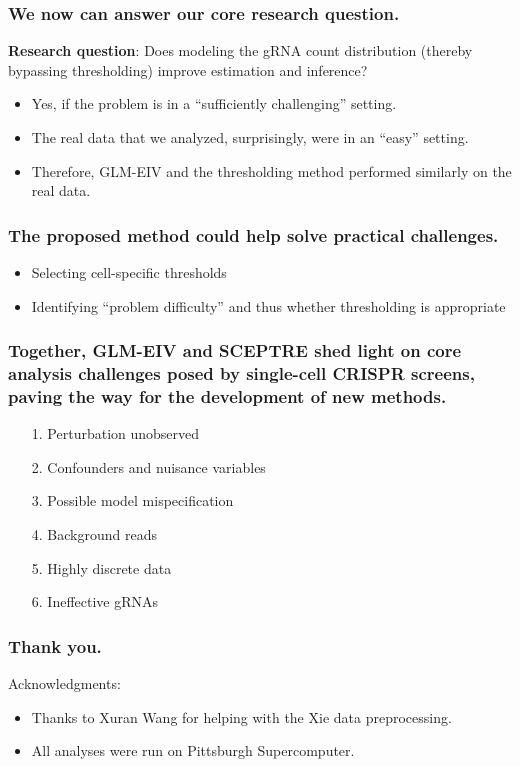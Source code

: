 \documentclass{beamer}
\begin{document}
\begin{frame}
\frametitle{We now can answer our core research question.}
\textbf{Research question}: Does modeling the gRNA count distribution (thereby bypassing thresholding) improve estimation and inference?
\begin{itemize}
\item Yes, if the problem is in a ``sufficiently challenging'' setting.
\item The real data that we analyzed, surprisingly, were in an ``easy'' setting.
\item Therefore, GLM-EIV and the thresholding method performed similarly on the real data.
\end{itemize}
\end{frame}


\begin{frame}
\frametitle{The proposed method could help solve practical challenges.}
\begin{itemize}
\item Selecting cell-specific thresholds
\item Identifying ``problem difficulty'' and thus whether thresholding is appropriate
\end{itemize}
\end{frame}

\begin{frame}
\frametitle{Together, GLM-EIV and SCEPTRE shed light on core analysis challenges posed by single-cell CRISPR screens, paving the way for the development of new methods.}
\begin{itemize}
\item[1.] Perturbation unobserved
\item[2.] Confounders and nuisance variables
\item[3.] Possible model mispecification
\item[4.] Background reads
\item[5.] Highly discrete data
\item[6.] Ineffective gRNAs
\end{itemize}
\end{frame}

\begin{frame}
\frametitle{Thank you.}
Acknowledgments:
\begin{itemize}
\item Thanks to Xuran Wang for helping with the Xie data preprocessing.
\item All analyses were run on Pittsburgh Supercomputer.
\end{itemize}
\end{frame}




\end{document}
